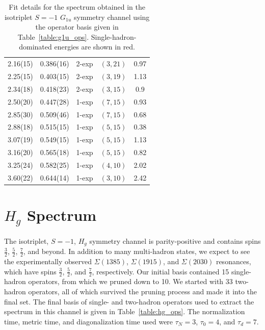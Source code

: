 \begin{table}[H]
\begin{tabu}{c|c|c|c|c}
        2.16(15)&0.386(16)&2{-}exp&$(3, 21)$&0.97\\
        2.25(15)&0.403(15)&2{-}exp&$(3, 19)$&1.13\\
        2.34(18)&0.418(23)&2{-}exp&$(3, 15)$&0.9\\
        2.50(20)&0.447(28)&1{-}exp&$(7, 15)$&0.93\\
        2.85(30)&0.509(46)&1{-}exp&$(7, 15)$&0.68\\
        \rowfont{\color{red}}
        2.88(18)&0.515(15)&1{-}exp&$(5, 15)$&0.38\\
        \rowfont{\color{red}}
        3.07(19)&0.549(15)&1{-}exp&$(5, 15)$&1.13\\
        \rowfont{\color{red}}
        3.16(20)&0.565(18)&1{-}exp&$(5, 15)$&0.82\\
        3.25(24)&0.582(25)&1{-}exp&$(4, 10)$&2.02\\
        3.60(22)&0.644(14)&1{-}exp&$(3, 10)$&2.42\\
    \end{tabu}
    \caption[Fit details for the spectrum obtained in the isotriplet $S=-1$ $G_{1u}$ symmetry channel using the operator basis given in Table~\ref{table:g1u_ops}.]{Fit details for the spectrum obtained in the isotriplet $S=-1$ $G_{1u}$ symmetry channel using the operator basis given in Table~\ref{table:g1u_ops}. Single-hadron-dominated energies are shown in red.}\label{table:g1u_fits}
\end{table}
\renewcommand{\arraystretch}{1.5}
\newpage
\section{$H_g$ Spectrum}
The isotriplet, $S=-1$, $H_g$ symmetry channel is parity-positive and contains spins $\frac{3}{2}$, $\frac{5}{2}$, $\frac{7}{2}$, and beyond. In addition to many multi-hadron states, we expect to see the experimentally observed $\Sigma(1385)$, $\Sigma(1915)$, and $\Sigma(2030)$ resonances, which have spins $\frac{3}{2}$, $\frac{5}{2}$, and $\frac{7}{2}$, respectively. Our initial basis contained 15 single-hadron operators, from which we pruned down to 10. We started with 33 two-hadron operators, all of which survived the pruning process and made it into the final set. The final basis of single- and two-hadron operators used to extract the spectrum in this channel is given in Table~\ref{table:hg_ops}. The normalization time, metric time, and diagonalization time used were $\tau_N=3$, $\tau_0=4$, and $\tau_d=7$. 

